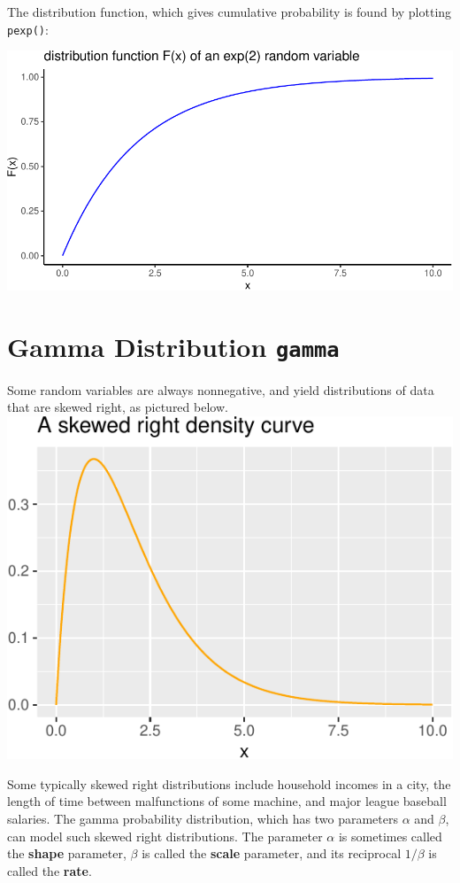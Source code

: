 \documentclass[
]{book}
\theoremstyle{definition}
\theoremstyle{definition}
\theoremstyle{definition}
\theoremstyle{definition}
\theoremstyle{remark}
\begin{document}
The distribution function, which gives cumulative probability is found by plotting \texttt{pexp()}:

\begin{center}\includegraphics{math340-notes_files/figure-latex/unnamed-chunk-182-1} \end{center}

\section{\texorpdfstring{Gamma Distribution \texttt{gamma}}{Gamma Distribution gamma}}\label{gammaR}

Some random variables are always nonnegative, and yield distributions of data that are skewed right, as pictured below.
\includegraphics{math340-notes_files/figure-latex/unnamed-chunk-184-1.pdf}

Some typically skewed right distributions include household incomes in a city, the length of time between malfunctions of some machine, and major league baseball salaries. The gamma probability distribution, which has two parameters \(\alpha\) and \(\beta\), can model such skewed right distributions. The parameter \(\alpha\) is sometimes called the \textbf{shape} parameter, \(\beta\) is called the \textbf{scale} parameter, and its reciprocal \(1/\beta\) is called the \textbf{rate}.
\end{document}
